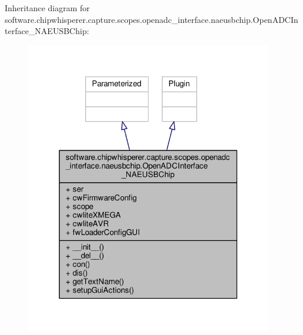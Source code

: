 Inheritance diagram for software.\+chipwhisperer.\+capture.\+scopes.\+openadc\+\_\+interface.\+naeusbchip.\+Open\+A\+D\+C\+Interface\+\_\+\+N\+A\+E\+U\+S\+B\+Chip\+:\nopagebreak
\begin{figure}[H]
\begin{center}
\leavevmode
\includegraphics[width=307pt]{dc/d7e/classsoftware_1_1chipwhisperer_1_1capture_1_1scopes_1_1openadc__interface_1_1naeusbchip_1_1OpenA27dce8539888469881594eb52fe619bf}
\end{center}
\end{figure}


